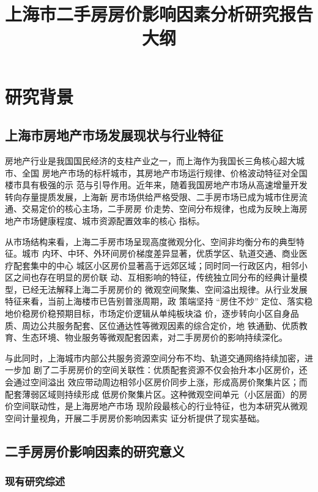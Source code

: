 \documentclass[UTF8]{ctexart}
\title{上海市二手房房价影响因素分析研究报告大纲}
\begin{document}
\maketitle%
\newpage%
\tableofcontents%
\newpage

\section{研究背景} 

\subsection{上海市房地产市场发展现状与行业特征} 

房地产行业是我国国民经济的支柱产业之一，而上海作为我国长三角核心超大城市、全国
房地产市场的标杆城市，其房地产市场运行规律、价格波动特征对全国楼市具有极强的示
范与引导作用。近年来，随着我国房地产市场从高速增量开发转向存量提质发展，上海新
房市场供给严格受限、二手房市场已成为城市住房流通、交易定价的核心主场，二手房房
价走势、空间分布规律，也成为反映上海房地产市场健康程度、城市资源配置效率的核心
指标。

从市场结构来看，上海二手房市场呈现高度微观分化、空间非均衡分布的典型特征。城市
内环、中环、外环间房价梯度差异显著，优质学区、轨道交通、商业医疗配套集中的中心
城区小区房价显著高于远郊区域；同时同一行政区内，相邻小区之间也存在明显的房价联
动、互相影响的特征，传统独立同分布的经典计量模型，已经无法解释上海二手房房价的
微观空间聚集、空间溢出规律。从行业发展特征来看，当前上海楼市已告别普涨周期，政
策端坚持 “房住不炒” 定位、落实稳地价稳房价稳预期目标，市场定价逻辑从单纯板块溢
价，逐步转向小区自身品质、周边公共服务配套、区位通达性等微观因素的综合定价，地
铁通勤、优质教育、生态环境、物业服务等微观配套因素，对二手房房价的影响持续深化。

与此同时，上海城市内部公共服务资源空间分布不均、轨道交通网络持续加密，进一步加
剧了二手房房价的空间关联性：优质配套资源不仅会抬升本小区房价，还会通过空间溢出
效应带动周边相邻小区房价同步上涨，形成高房价聚集片区；而配套薄弱区域则持续形成
低房价聚集片区。这种微观空间单元（小区层面）的房价空间联动性，是上海房地产市场
现阶段最核心的行业特征，也为本研究从微观空间计量视角，开展二手房房价影响因素实
证分析提供了现实基础。

\subsection{二手房房价影响因素的研究意义}

\subsubsection{现有研究综述}
\end{document}
